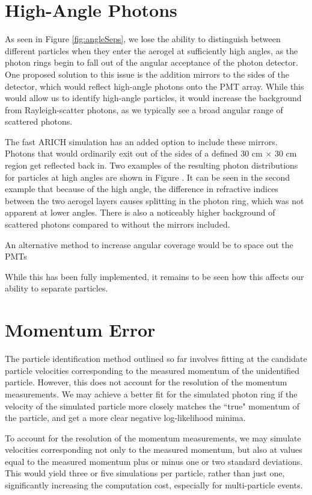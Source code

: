 \section{High-Angle Photons}
As seen in Figure \ref{fig:angleSeps}, we lose the ability to distinguish between different particles when they enter the aerogel at sufficiently high angles, as the photon rings begin to fall out of the angular acceptance of the photon detector.
One proposed solution to this issue is the addition mirrors to the sides of the detector, which would reflect high-angle photons onto the PMT array. 
While this would allow us to identify high-angle particles, it would increase the background from Rayleigh-scatter photons, as we typically see a broad angular range of scattered photons.

The fast ARICH simulation has an added option to include these mirrors.
Photons that would ordinarily exit out of the sides of a defined 30 cm $\times$ 30 cm region get reflected back in.
Two examples of the resulting photon distributions for particles at high angles are shown in Figure .
It can be seen in the second example that because of the high angle, the difference in refractive indices between the two aerogel layers causes splitting in the photon ring, which was not apparent at lower angles.
There is also a noticeably higher background of scattered photons compared to without the mirrors included.

An alternative method to increase angular coverage would be to space out the PMTs

While this has been fully implemented, it remains to be seen how this affects our ability to separate particles. 


\section{Momentum Error}
The particle identification method outlined so far involves fitting at the candidate particle velocities corresponding to the measured momentum of the unidentified particle.
However, this does not account for the resolution of the momentum measurements.
We may achieve a better fit for the simulated photon ring if the velocity of the simulated particle more closely matches the ``true" momentum of the particle, and get a more clear negative log-likelihood minima. 

To account for the resolution of the momentum measurements, we may simulate velocities corresponding not only to the measured momentum, but also at values equal to the measured momentum plus or minus one or two standard deviations.
This would yield three or five simulations per particle, rather than just one, significantly increasing the computation cost, especially for multi-particle events. 

